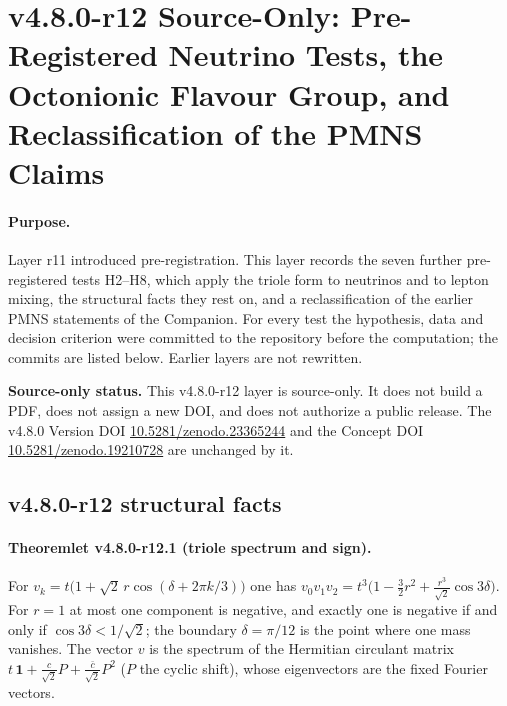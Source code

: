 
\clearpage
\section*{v4.8.0-r12 Source-Only: Pre-Registered Neutrino Tests, the Octonionic Flavour Group, and Reclassification of the PMNS Claims}
\label{sec:v480-r12-neutrino-flavour}

\paragraph{Purpose.}
Layer r11 introduced pre-registration.  This layer records the seven further pre-registered tests
H2--H8, which apply the triole form to neutrinos and to lepton mixing, the structural facts they rest on,
and a reclassification of the earlier PMNS statements of the Companion.  For every test the hypothesis,
data and decision criterion were committed to the repository before the computation; the commits are
listed below.  Earlier layers are not rewritten.

\noindent\textbf{Source-only status.}
This v4.8.0-r12 layer is source-only.  It does not build a PDF, does not assign a new DOI,
and does not authorize a public release.  The v4.8.0 Version DOI
\href{https://doi.org/10.5281/zenodo.23365244}{10.5281/zenodo.23365244} and the Concept DOI
\href{https://doi.org/10.5281/zenodo.19210728}{10.5281/zenodo.19210728} are unchanged by it.

\subsection*{v4.8.0-r12 structural facts}
\label{subsec:v480-r12-structure}

\paragraph{Theoremlet v4.8.0-r12.1 (triole spectrum and sign).}
For \(v_k=t\bigl(1+\sqrt2\,r\cos(\delta+2\pi k/3)\bigr)\) one has
\(v_0v_1v_2=t^3\bigl(1-\tfrac32r^2+\tfrac{r^3}{\sqrt2}\cos3\delta\bigr)\).  For \(r=1\) at most one
component is negative, and exactly one is negative if and only if \(\cos3\delta<1/\sqrt2\); the boundary
\(\delta=\pi/12\) is the point where one mass vanishes.  The vector \(v\) is the spectrum of the Hermitian
circulant matrix \(t\,\mathbf 1+\tfrac{c}{\sqrt2}P+\tfrac{\bar c}{\sqrt2}P^2\) (\(P\) the cyclic shift),
whose eigenvectors are the fixed Fourier vectors.

